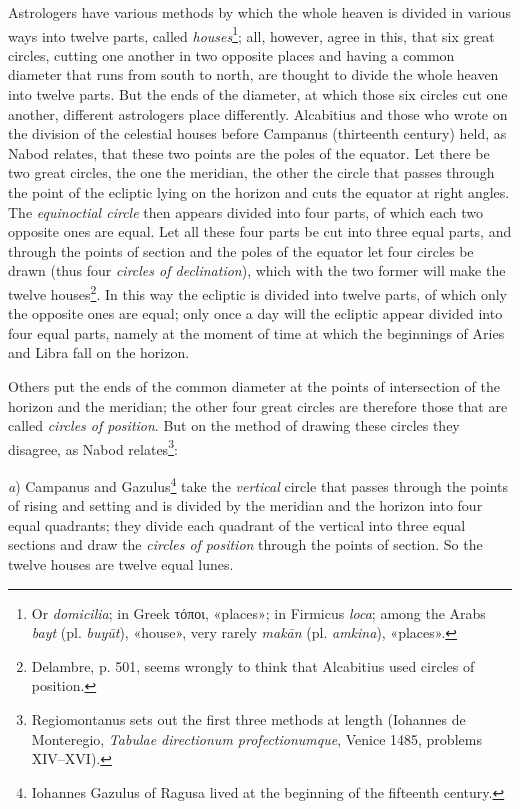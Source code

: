 \documentclass[11pt]{article}
\newcommand{\Pg}[1]{\marginpar{\footnotesize\color{gray}#1}}
\begin{document}
\par \Pg{I 247}Astrologers have various methods by which the whole heaven is divided in various ways into twelve parts, called \emph{houses}\footnote{Or \emph{domicilia}; in Greek {\greekfont τόποι}, «places»; in Firmicus \emph{loca}; among the Arabs \emph{bayt} (pl. \emph{buyūt}), «house», very rarely \emph{makān} (pl. \emph{amkina}), «places».}; all, however, agree in this, that six great circles, cutting one another in two opposite places and having a common diameter that runs from south to north, are thought to divide the whole heaven into twelve parts. But the ends of the diameter, at which those six circles cut one another, different astrologers place differently. Alcabitius and those who wrote on the division of the celestial houses before Campanus (thirteenth century) held, as Nabod relates, that these two points are the poles of the equator. Let there be two great circles, the one the meridian, the other the circle that passes through the point of the ecliptic lying on the horizon and cuts the equator at right angles. The \emph{equinoctial circle} then appears divided into four parts, of which each two opposite ones are equal. Let all these four parts be cut into three equal parts, and through the points of section and the poles of the equator let four circles be drawn (thus four \emph{circles of declination}), which with the two former will make the twelve houses\footnote{Delambre, p. 501, seems wrongly to think that Alcabitius used circles of position.}. In this way the ecliptic is divided into twelve parts, of which only the opposite ones are equal; only once a day will the ecliptic appear divided into four equal parts, namely at the moment of time at which the beginnings of Aries and Libra fall on the horizon.\par
\par Others put the ends of the common diameter at the points of intersection of the horizon and the meridian; the other four great circles are therefore those that are called \emph{circles of position}. But on the method of drawing these circles they disagree, as Nabod relates\footnote{Regiomontanus sets out the first three methods at length (Iohannes de Monteregio, \emph{Tabulae directionum profectionumque}, Venice 1485, problems XIV–XVI).}:\par
\par \emph{a}) Campanus and Gazulus\footnote{Iohannes Gazulus of Ragusa lived at the beginning of the fifteenth century.} take the \emph{vertical} circle that passes through the points of rising and setting and is divided by the meridian and the horizon into four equal quadrants; they divide each quadrant of the vertical into three equal sections and draw the \emph{circles of position} through the points of section. So the twelve houses are twelve equal lunes.\par
\end{document}
